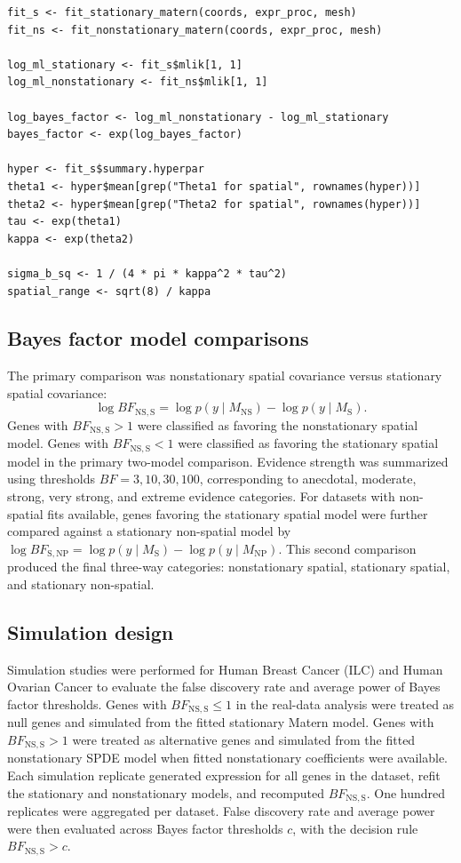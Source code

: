 \begin{lstlisting}[style=rcode,caption={Marginal likelihood Bayes factor and stationary-equivalent summaries.}]
fit_s <- fit_stationary_matern(coords, expr_proc, mesh)
fit_ns <- fit_nonstationary_matern(coords, expr_proc, mesh)

log_ml_stationary <- fit_s$mlik[1, 1]
log_ml_nonstationary <- fit_ns$mlik[1, 1]

log_bayes_factor <- log_ml_nonstationary - log_ml_stationary
bayes_factor <- exp(log_bayes_factor)

hyper <- fit_s$summary.hyperpar
theta1 <- hyper$mean[grep("Theta1 for spatial", rownames(hyper))]
theta2 <- hyper$mean[grep("Theta2 for spatial", rownames(hyper))]
tau <- exp(theta1)
kappa <- exp(theta2)

sigma_b_sq <- 1 / (4 * pi * kappa^2 * tau^2)
spatial_range <- sqrt(8) / kappa
\end{lstlisting}

\subsection{Bayes factor model comparisons}
The primary comparison was nonstationary spatial covariance versus stationary spatial covariance:
\[
\log BF_{\mathrm{NS,S}} = \log p(y \mid M_{\mathrm{NS}}) - \log p(y \mid M_{\mathrm{S}}).
\]
Genes with \(BF_{\mathrm{NS,S}}>1\) were classified as favoring the nonstationary spatial model. Genes with \(BF_{\mathrm{NS,S}}<1\) were classified as favoring the stationary spatial model in the primary two-model comparison. Evidence strength was summarized using thresholds \(BF=3,10,30,100\), corresponding to anecdotal, moderate, strong, very strong, and extreme evidence categories. For datasets with non-spatial fits available, genes favoring the stationary spatial model were further compared against a stationary non-spatial model by \(\log BF_{\mathrm{S,NP}} = \log p(y \mid M_{\mathrm{S}})-\log p(y \mid M_{\mathrm{NP}})\). This second comparison produced the final three-way categories: nonstationary spatial, stationary spatial, and stationary non-spatial.

\subsection{Simulation design}
Simulation studies were performed for Human Breast Cancer (ILC) and Human Ovarian Cancer to evaluate the false discovery rate and average power of Bayes factor thresholds. Genes with \(BF_{\mathrm{NS,S}}\le 1\) in the real-data analysis were treated as null genes and simulated from the fitted stationary Matern model. Genes with \(BF_{\mathrm{NS,S}}>1\) were treated as alternative genes and simulated from the fitted nonstationary SPDE model when fitted nonstationary coefficients were available. Each simulation replicate generated expression for all genes in the dataset, refit the stationary and nonstationary models, and recomputed \(BF_{\mathrm{NS,S}}\). One hundred replicates were aggregated per dataset. False discovery rate and average power were then evaluated across Bayes factor thresholds \(c\), with the decision rule \(BF_{\mathrm{NS,S}}>c\).

